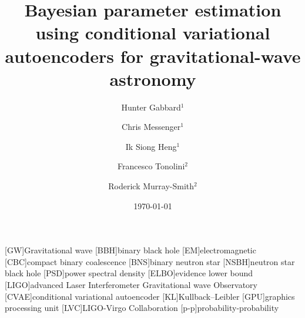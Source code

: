 \documentclass[%
showpacs,
nofootinbib,
 amsmath,amssymb,
 aps,
 twocolumn,
 prl,
 reprint,
floatfix,
]{revtex4-1}
\begin{document}

\title{Bayesian parameter estimation using conditional variational autoencoders
for gravitational-wave astronomy}

\author{Hunter Gabbard$^1$}
\author{Chris Messenger$^1$}
\author{Ik Siong Heng$^1$}
\author{Francesco Tonolini$^2$}
\author{Roderick Murray-Smith$^2$}


\date{\today}

\maketitle

%

[GW]{Gravitational wave}
[BBH]{binary black hole}
[EM]{electromagnetic}
[CBC]{compact binary coalescence}
[BNS]{binary neutron star}
[NSBH]{neutron star black hole}
[PSD]{power spectral density}
[ELBO]{evidence lower bound}
[LIGO]{advanced Laser Interferometer Gravitational wave Observatory}
[CVAE]{conditional variational autoencoder}
[KL]{Kullback--Leibler}
[GPU]{graphics processing unit}
[LVC]{LIGO-Virgo Collaboration}
[p-p]{probability-probability}
\end{document}
